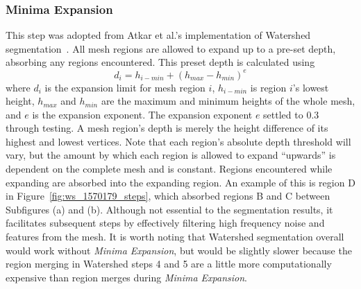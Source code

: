 \subsubsection{Minima Expansion}
This step was adopted from Atkar et al.'s implementation of Watershed segmentation~\cite{HierSurfSeg_for_autobody_painting}.
All mesh regions are allowed to expand up to a pre-set depth, absorbing any regions encountered.
This preset depth is calculated using
\begin{equation*}
	d_i = h_{i-min} + \left(h_{max} - h_{min}\right)^{e}
\end{equation*}
where $d_i$ is the expansion limit for mesh region $i$, $h_{i-min}$ is region $i$'s lowest height, $h_{max}$ and $h_{min}$ are the maximum and minimum heights of the whole mesh, and $e$ is the expansion exponent.
The expansion exponent $e$ settled to 0.3 through testing.
A mesh region's depth is merely the height difference of its highest and lowest vertices.
Note that each region's absolute depth threshold will vary, but the amount by which each region is allowed to expand ``upwards'' is dependent on the complete mesh and is constant.
Regions encountered while expanding are absorbed into the expanding region.
An example of this is region D in Figure~\ref{fig:ws_1570179_steps}, which absorbed regions B and C between Subfigures (a) and (b).
Although not essential to the segmentation results, it facilitates subsequent steps by effectively filtering high frequency noise and features from the mesh.
It is worth noting that Watershed segmentation overall would work without \textit{Minima Expansion}, but would be slightly slower because the region merging in Watershed steps 4 and 5 are a little more computationally expensive than region merges during \textit{Minima Expansion}.

